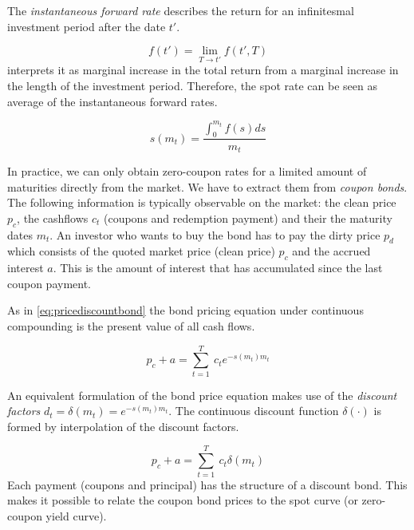 The \emph{instantaneous forward rate} describes the return for an infinitesmal investment period after the date $t'$.

\begin{equation}
  \label{eq:instforw}
  f(t') = \lim_{T\rightarrow t'}f(t',T)
\end{equation}
\cite{Svensson1994} interprets it as marginal increase in the total return from a marginal increase in the length of the investment period. Therefore, the spot rate can be seen as average of the instantaneous forward rates.

\begin{equation}
  \label{eq:avgforwardrate}
  s(m_t)=\frac{\int_0^{m_t}f(s)ds}{m_t}
\end{equation}

In practice, we can only obtain zero-coupon rates for a limited amount of maturities directly from the market. We have to extract them from \emph{coupon bonds}. The following information is typically observable on the market: the clean price $p_c$, the cashflows $c_t$ (coupons and redemption payment) and their the maturity dates $m_t$. An investor who wants to buy the bond has to pay the dirty price $p_d$ which consists of the quoted market price (clean price) $p_c$ and the accrued interest $a$. This is the amount of interest that has accumulated since the last coupon payment.

As in \eqref{eq:pricediscountbond} the bond pricing equation under continuous compounding is the present value of all cash flows.

\begin{equation}
  \label{bondpriceeq}
  p_c+a = \sum_{t=1}^T \ c_t e^{-s(m_t)m_t}
\end{equation}



An equivalent formulation of the bond price equation makes use of the \emph{discount factors} $d_t=\delta(m_t)=e^{-s(m_t)m_t}$. The continuous discount function $\delta(\cdot)$ is formed by interpolation of the discount factors.


\begin{equation}
  \label{bondprceq2}
  p_c+a=\sum_{t=1}^T \ c_t \delta(m_t) 
\end{equation}
Each payment (coupons and principal) has the structure of a discount bond. This makes it possible to relate the coupon bond prices to the spot curve (or zero-coupon yield curve).

